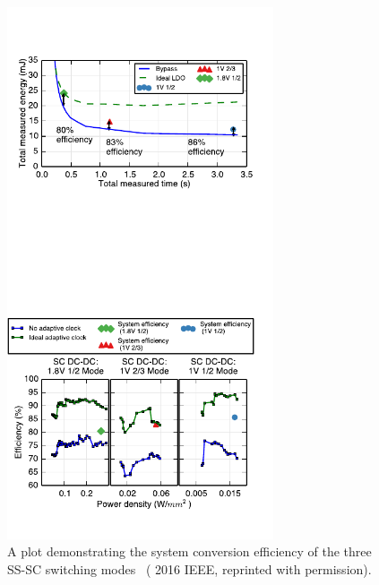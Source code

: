 \documentclass[graybox]{svmult}
\begin{document}
\begin{figure}
  \centering
  \includegraphics[width=0.7\textwidth]{6-raven3-dcdc-efficiency}
  \caption{A plot demonstrating the system conversion efficiency of the three SS-SC switching modes~\cite{Zimmer2016} ({\textcopyright} 2016 IEEE, reprinted with permission).}
  \label{fig:6-raven3-dcdc-efficiency}
\end{figure}
\end{document}
